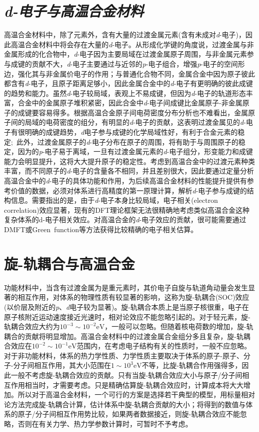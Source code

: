 \section{\it{d}-电子与高温合金材料}
高温合金材料中，除了元素外，含有大量的过渡金属元素(含有未成对\textit{d}-电子)，因此高温合金材料中将会存在大量的\textit{d}-电子。从形成化学键的角度说，过渡金属与非金属形成的化合物中，\textit{d}-电子因为主要局域在过渡金属原子周围，与非金属元素参与成键的贡献不大，\textit{d}-电子主要通过与近邻的\textit{p}-电子组合，增强\textit{p}-电子的空间形边，强化其与非金属价电子的作用；与普通化合物不同，金属合金中因为原子彼此都含有\textit{d}-电子，且原子距离足够小，因此金属合金中的\textit{d}-电子有更明确的彼此成键的趋势和能力。虽然\textit{d}-电子较局域，表观上不易成键，但因为\textit{d}-电子的轨道形态丰富，合金中的金属原子堆积紧密，因此合金中\textit{d}-电子间成键比金属原子-非金属原子的成键要容易得多。根据高温合金原子间电荷密度分布分析也不难看出，金属原子间的局域的电荷密度的组分，有明显的\textit{d}-电子的贡献，这表明过渡金属见的\textit{d}-电子有很明确的成键趋势，\textit{d}电子参与成键的化学局域性好，有利于合金元素的稳定;~此外，过渡金属原子的\textit{d}-电子分布在原子的周围，将有助于与周围原子的稳定，因为的\textit{p}-电子易于离域，一旦有过渡金属元素的\textit{d}-电子组分，形变能力和成键能力会明显提升，这将大大提升原子的稳定性。考虑到高温合金中的过渡元素种类丰富，而不同原子的\textit{d}-电子的含量各不相同，并且差别很大，因此要通过定量分析高温合金中的\textit{d}-电子的具体功能和作用，为后续高温合金材料的性能提升提供有参考价值的数据，必须对体系进行高精度的第一原理计算，解析\textit{d}-电子参与成键的结构信息。需要指出的是，由于\textit{d}-电子本身比较局域，电子相关(\textrm{electron correlation})效应显著，现有的\textrm{DFT}理论框架无法很精确地考虑类似高温合金这种复杂体系的\textrm{d}-电子相关效应。对高温合金的\textit{d}-电子效应的贡献，很可能需要通过\textrm{DMFT}或\textrm{Green~function}等方法获得比较精确的电子相关估算。

\section{旋-轨耦合与高温合金}
功能材料中，当含有过渡金属为是重元素时，其价电子自旋与轨道角动量会发生显著的相互作用，对体系的物理性质有较显著的影响，这称为旋-轨耦合\textrm{(SOC)}效应(以价层及附近的\textit{p}、\textit{d}电子较为显著)。旋-轨耦合本质上是当原子核很重，电子在原子核附近运动速度接近光速时，相对论效应不能忽略引起的。对于轻元素，旋-轨耦合效应大约为$10^{-3}\sim10^{-2}\mathrm{eV}$，一般可以忽略。但随着核电荷数的增加，旋-轨耦合的贡献将明显增加。高温合金材料中的过渡金属合金组分多且复杂，旋-轨耦合效应在$10^{-2}\sim10^{-1}\mathrm{eV}$范围内，在考虑电子结构有关的性质时，一般不应忽略。对于非功能材料，体系的热力学性质、力学性质主要取决于体系的原子-原子、分子-分子间相互作用，其大小范围在$1\sim10^3\mathrm{eV}$不等，比旋-轨耦合作用强得多，因此一般不考虑旋-轨耦合效应的贡献。只有当旋-轨耦合效应大小与原子/分子间相互作用相当时，才需要考虑。只是精确估算旋-轨耦合效应时，计算成本将大大增加。所以对于高温合金材料，一个可行的方案是选择若干典型的模型，用标量相对论方法完成旋-轨耦合计算，估计体系中旋-轨耦合贡献的大小；将得到的数值与体系的原子/分子间相互作用势比较，如果两者数据接近，则旋-轨耦合效应不能忽略，否则在有关力学、热力学参数计算时，可暂时不予考虑。

